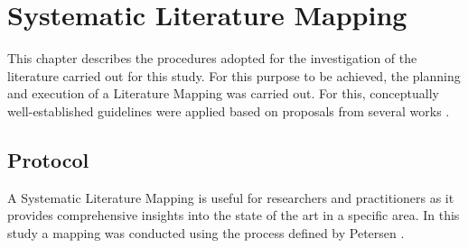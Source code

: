 \chapter{Systematic Literature Mapping}
\label{chap:slm}


This chapter describes the procedures adopted for the investigation of the literature carried out for this study.
For this purpose to be achieved, the planning and execution of a Literature Mapping was carried out.
For this, conceptually well-established guidelines were applied based on proposals from several works \cite{Kitchenham:2007, Petersen:2008, Nakagawa:2017}.




\section{Protocol}\label{sec:slr_protocol}


A Systematic Literature Mapping is useful for researchers and practitioners as it provides comprehensive insights into the state of the art in a specific area.
In this study a mapping was conducted using the process defined by Petersen \cite{Petersen:2008}.

